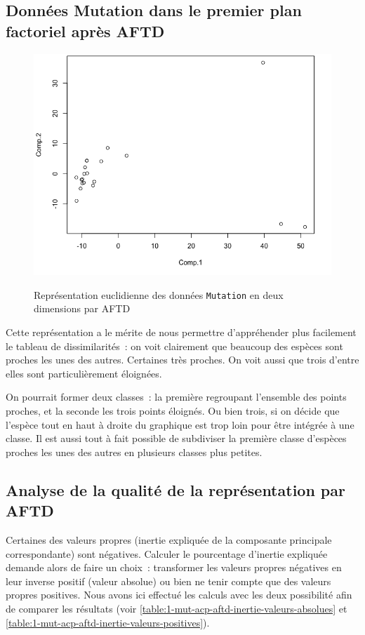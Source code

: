 \documentclass[a4paper,10pt]{report}
\begin{document}
\subsection{Données Mutation dans le premier plan factoriel après AFTD}
\label{subsection:1-3-1-mut-premier-plan-factoriel}

\begin{figure}[H]
	\centering
	\captionsetup{justification=centering, margin=4cm}
	\caption{\small Représentation euclidienne des données \texttt{Mutation} en deux dimensions par AFTD}
	\includegraphics[width=.5\linewidth]{img/1-mut-acp-aftd-premier-plan-factoriel}
	\label{fig:1-mut-acp-aftd-deux-dimensions}%
\end{figure}


Cette représentation a le mérite de nous permettre d'appréhender plus facilement le tableau de dissimilarités~: on voit clairement que beaucoup des espèces sont proches les unes des autres. Certaines très proches. On voit aussi que trois d'entre elles sont particulièrement éloignées.

On pourrait former deux classes~: la première regroupant l'ensemble des points proches, et la seconde les trois points éloignés. Ou bien trois, si on décide que l'espèce tout en haut à droite du graphique est trop loin pour être intégrée à une classe. Il est aussi tout à fait possible de subdiviser la première classe d'espèces proches les unes des autres en plusieurs classes plus petites.




\subsection{Analyse de la qualité de la représentation par AFTD}

Certaines des valeurs propres (inertie expliquée de la composante principale correspondante) sont négatives. Calculer le pourcentage d'inertie expliquée demande alors de faire un choix~: transformer les valeurs propres négatives en leur inverse positif (valeur absolue) ou bien ne tenir compte que des valeurs propres positives. Nous avons ici effectué les calculs avec les deux possibilité afin de comparer les résultats (voir \autoref{table:1-mut-acp-aftd-inertie-valeurs-absolues} et \autoref{table:1-mut-acp-aftd-inertie-valeurs-positives}).
\end{document}
